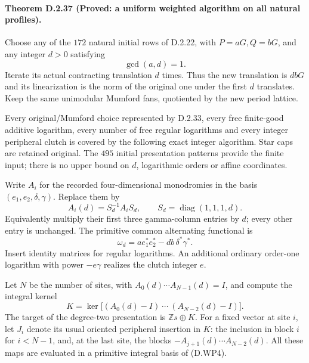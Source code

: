\paragraph{Theorem D.2.37 (Proved: a uniform weighted algorithm on all natural profiles).}
Choose any of the $172$ natural initial rows of D.2.22,
with $P=aG,Q=bG$, and any integer $d>0$ satisfying
\[
                         \gcd(a,d)=1.                    \tag{D.WP1}
\]
Iterate its actual contracting translation $d$ times.
Thus the new translation is $dbG$ and its linearization
is the norm of the original one under the first $d$
translates. Keep the same unimodular Mumford fans,
quotiented by the new period lattice.

Every original/Mumford choice represented by D.2.33,
every free finite-good additive logarithm, every number
of free regular logarithms and every integer peripheral
clutch is covered by the following exact integer
algorithm. Star caps are retained original. The
$495$ initial presentation patterns provide the finite
input; there is no upper bound on $d$, logarithmic
orders or affine coordinates.

Write $A_i$ for the recorded four-dimensional
monodromies in the basis $(e_1,e_2,\delta,\gamma)$.
Replace them by
\[
 A_i(d)=S_d^{-1}A_iS_d,\qquad
 S_d=\operatorname{diag}(1,1,1,d).
                                                               \tag{D.WP2}
\]
Equivalently multiply their first three gamma-column
entries by $d$; every other entry is unchanged.
The primitive common alternating functional is
\[
 \omega_d=a e_1^*e_2^*-db\,\delta^*\gamma^*.                \tag{D.WP3}
\]
Insert identity matrices for regular logarithms.
An additional ordinary order-one logarithm with power
$-e\gamma$ realizes the clutch integer $e$.

Let $N$ be the number of sites, with
$A_0(d)\cdots A_{N-1}(d)=I$, and compute the integral
kernel
\[
 K=\ker\bigl[(A_0(d)-I)\ \cdots\ (A_{N-2}(d)-I)\bigr].
                                                               \tag{D.WP4}
\]
The target of the degree-two presentation is
$\mathbb Zs\oplus K$. For a fixed vector at site $i$,
let $J_i$ denote its usual oriented peripheral
insertion in $K$: the inclusion in block $i$ for
$i<N-1$, and, at the last site, the blocks
$-A_{j+1}(d)\cdots A_{N-2}(d)$.
All these maps are evaluated in a primitive integral
basis of (D.WP4).

